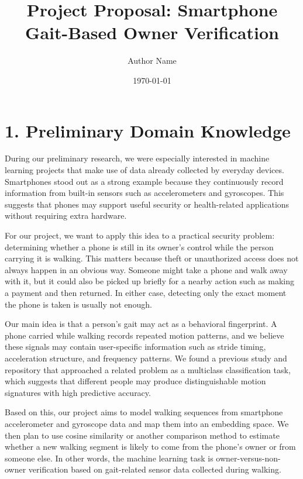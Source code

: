 \documentclass[11pt]{article}
\title{Project Proposal: Smartphone Gait-Based Owner Verification}
\author{Author Name}
\date{\today}
\begin{document}
\maketitle

\section{1. Preliminary Domain Knowledge}

During our preliminary research, we were especially interested in machine learning projects that make use of data already collected by everyday devices. Smartphones stood out as a strong example because they continuously record information from built-in sensors such as accelerometers and gyroscopes. This suggests that phones may support useful security or health-related applications without requiring extra hardware.

For our project, we want to apply this idea to a practical security problem: determining whether a phone is still in its owner's control while the person carrying it is walking. This matters because theft or unauthorized access does not always happen in an obvious way. Someone might take a phone and walk away with it, but it could also be picked up briefly for a nearby action such as making a payment and then returned. In either case, detecting only the exact moment the phone is taken is usually not enough.

Our main idea is that a person's gait may act as a behavioral fingerprint. A phone carried while walking records repeated motion patterns, and we believe these signals may contain user-specific information such as stride timing, acceleration structure, and frequency patterns. We found a previous study and repository that approached a related problem as a multiclass classification task, which suggests that different people may produce distinguishable motion signatures with high predictive accuracy.

Based on this, our project aims to model walking sequences from smartphone accelerometer and gyroscope data and map them into an embedding space. We then plan to use cosine similarity or another comparison method to estimate whether a new walking segment is likely to come from the phone's owner or from someone else. In other words, the machine learning task is owner-versus-non-owner verification based on gait-related sensor data collected during walking.
\end{document}
